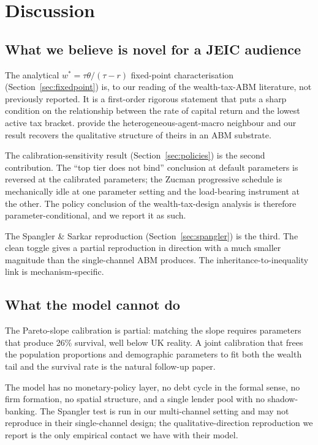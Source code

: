\documentclass[11pt]{article}
\begin{document}
\section{Discussion}

\subsection{What we believe is novel for a JEIC audience}

The analytical $w^* = \tau \theta / (\tau - r)$ fixed-point
characterisation (Section~\ref{sec:fixedpoint}) is, to our reading
of the wealth-tax-ABM literature, not previously reported.  It is a
first-order rigorous statement that puts a sharp condition on
the relationship between the rate of capital return and the lowest
active tax bracket.  \citet{benhabib2011distribution} provide the
heterogeneous-agent-macro neighbour and our result recovers the
qualitative structure of theirs in an ABM substrate.

The calibration-sensitivity result
(Section~\ref{sec:policies}) is the second contribution.  The
``top tier does not bind'' conclusion at default parameters is
reversed at the calibrated parameters; the Zucman progressive
schedule is mechanically idle at one parameter setting and the
load-bearing instrument at the other.  The policy conclusion of the
wealth-tax-design analysis is therefore parameter-conditional, and
we report it as such.

The Spangler \& Sarkar reproduction
(Section~\ref{sec:spangler}) is the third.  The clean toggle gives a
partial reproduction in direction with a much smaller magnitude than
the single-channel ABM produces.  The inheritance-to-inequality
link is mechanism-specific.

\subsection{What the model cannot do}

The Pareto-slope calibration is partial: matching the slope requires
parameters that produce 26\% survival, well below UK reality.
A joint calibration that frees the population proportions and
demographic parameters to fit both the wealth tail and the survival
rate is the natural follow-up paper.

The model has no monetary-policy layer, no debt cycle in the formal
sense, no firm formation, no spatial structure, and a single lender
pool with no shadow-banking.  The Spangler test is run in our
multi-channel setting and may not reproduce in their single-channel
design; the qualitative-direction reproduction we report is the only
empirical contact we have with their model.
\end{document}
